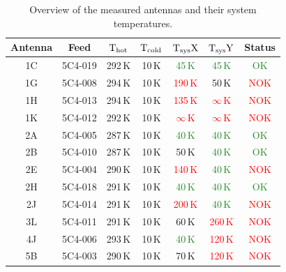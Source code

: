 \documentclass[12pt,a4paper,oneside]{article}
\begin{document}
\begin{table}[h]
\caption{Overview of the measured antennas and their system temperatures.} %
\centering
\begin{tabular}{@{}ccccccc@{}}
\toprule
Antenna & Feed    & $\rm{T}_{\rm{hot}}$ & $\rm{T}_{\rm{cold}}$ & $\rm{T}_{\rm{sys}}\rm{X}$    & $\rm{T}_{\rm{sys}}\rm{Y}$   & Status \\ \midrule
1C      & 5C4-019 & 292\,K  & 10\,K    & \textcolor{ForestGreen}{45\,K}      & \textcolor{ForestGreen}{45\,K}       	& \textcolor{ForestGreen}{OK}     \\
1G      & 5C4-008 & 294\,K  & 10\,K    & \textcolor{Red}{190\,K}     		& \textcolor{YellowOrange}{50\,K}     & \textcolor{Red}{NOK}     \\
1H      & 5C4-013 & 294\,K  & 10\,K    & \textcolor{Red}{135\,K}      		& \textcolor{Red}{$\infty$\,K} 		& \textcolor{Red}{NOK}     \\
1K      & 5C4-012 & 292\,K  & 10\,K    & \textcolor{Red}{$\infty$\,K}  		& \textcolor{Red}{$\infty$\,K}  		& \textcolor{Red}{NOK}     \\
2A      & 5C4-005 & 287\,K  & 10\,K    & \textcolor{ForestGreen}{40\,K}      & \textcolor{ForestGreen}{40\,K}      	& \textcolor{ForestGreen}{OK}      \\
2B      & 5C4-010 & 287\,K  & 10\,K    & \textcolor{YellowOrange}{50\,K}    & \textcolor{ForestGreen}{40\,K}       	& \textcolor{ForestGreen}{OK}      \\
2E      & 5C4-004 & 290\,K  & 10\,K    & \textcolor{Red}{140\,K}      		& \textcolor{ForestGreen}{40\,K}       	& \textcolor{Red}{NOK}     \\
2H      & 5C4-018 & 291\,K  & 10\,K    & \textcolor{ForestGreen}{40\,K}      & \textcolor{ForestGreen}{40\,K}      	& \textcolor{ForestGreen}{OK}     \\
2J      & 5C4-014 & 291\,K  & 10\,K    & \textcolor{Red}{200\,K}       		& \textcolor{ForestGreen}{40\,K}        & \textcolor{Red}{NOK}    \\
3L      & 5C4-011 & 291\,K  & 10\,K    & \textcolor{YellowOrange}{60\,K}     & \textcolor{Red}{260\,K}       		& \textcolor{Red}{NOK}     \\
4J      & 5C4-006 & 293\,K  & 10\,K    & \textcolor{ForestGreen}{40\,K}       & \textcolor{Red}{120\,K}       		& \textcolor{Red}{NOK}     \\
5B      & 5C4-003 & 290\,K  & 10\,K    & \textcolor{YellowOrange}{70\,K}     & \textcolor{Red}{120\,K}       		& \textcolor{Red}{NOK}     \\ \bottomrule
\end{tabular}
\label{tab:antennaoverview}
\end{table}
\end{document}
